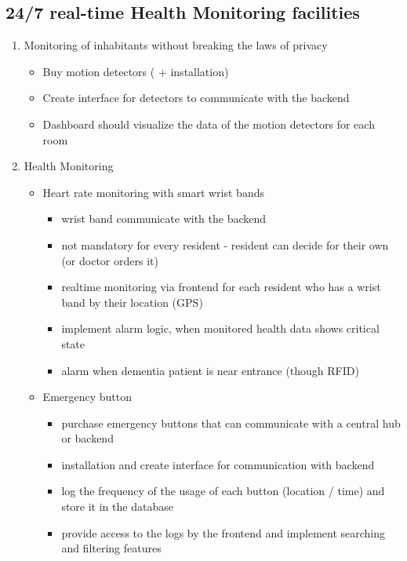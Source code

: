 \subsection{24/7 real-time Health Monitoring facilities}
\label{sec:orgb3edcb5}
\begin{enumerate}
\item Monitoring of inhabitants without breaking the laws of privacy
\label{sec:orgd852888}
\begin{itemize}
\item Buy motion detectors ( + installation)
\item Create interface for detectors to communicate with the backend
\item Dashboard should visualize the data of the motion detectors for each room
\end{itemize}

\item Health Monitoring
\label{sec:org97d117c}
\begin{itemize}
\item Heart rate  monitoring with smart wrist bands
\begin{itemize}
\item wrist band communicate with the backend
\item not mandatory for every resident - resident can decide for their own (or doctor orders it)
\item realtime monitoring via frontend for each resident who has a wrist band by their location (GPS)
\item implement alarm logic, when monitored health data shows critical state
\item alarm when dementia patient is near entrance (though RFID)
\end{itemize}

\item Emergency button
\begin{itemize}
\item purchase emergency buttons that can communicate with a central hub or backend
\item installation and create interface for communication with backend
\item log the frequency of the usage of each button (location / time) and store it in the database
\item provide access to the logs by the frontend and implement searching and filtering features
\end{itemize}
\end{itemize}
\end{enumerate}

